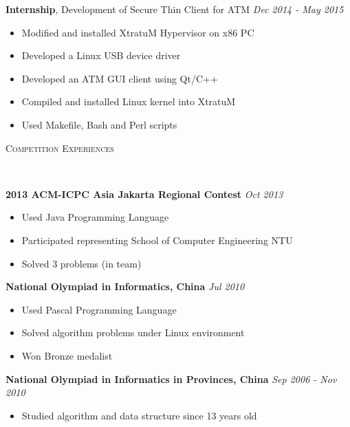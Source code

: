 \documentclass[a4paper, 12pt]{article}
\newenvironment{changemargin}[2]{%
  \begin{list}{}{%
      \setlength{\topsep}{0pt}%
      \setlength{\leftmargin}{#1}%
      \setlength{\rightmargin}{#2}%
      \setlength{\listparindent}{\parindent}%
      \setlength{\itemindent}{\parindent}%
      \setlength{\parsep}{\parskip}%
    }%
  \item[]}{\end{list}
}
\newcommand{\lineover}{
  \begin{changemargin}{-0.05in}{-0.05in}
    \vspace*{-8pt}
    \hrulefill \\
    \vspace*{-2pt}
  \end{changemargin}
}
\newcommand{\header}[1]{
  \begin{changemargin}{-0.6in}{-0.6in}
    \fontsize{15}{15}\scshape{#1}\\
    \lineover
    \vspace*{-4pt}
  \end{changemargin}
}
\newenvironment{body}
{
\vspace*{-16pt}
\begin{changemargin}{-0.25in}{-0.5in}
}
{
\end{changemargin}
}
\begin{document}
\begin{body}
  \textbf{Internship}, {Development of Secure Thin Client for ATM} \hfill \emph{Dec 2014 - May 2015}\\
  \vspace*{-6pt}
  \begin{itemize} \itemsep -0pt  \small
  \item Modified and installed XtratuM Hypervisor on x86 PC
  \item Developed a Linux USB device driver
  \item Developed an ATM GUI client using Qt/C++
  \item Compiled and installed Linux kernel into XtratuM
  \item Used Makefile, Bash and Perl scripts
  \end{itemize}
\end{body}

\header{Competition Experiences}

\begin{body}
  \vspace{14pt}

  \textbf{2013 ACM-ICPC Asia Jakarta Regional Contest} \hfill \emph{Oct 2013}\\
  \vspace*{-6pt}
  \begin{itemize} \itemsep -0pt  \small
  \item Used Java Programming Language
  \item Participated representing School of Computer Engineering NTU
  \item Solved 3 problems (in team)
  \end{itemize}
  
  \textbf{National Olympiad in Informatics, China} \hfill \emph{Jul 2010}\\
  \vspace*{-6pt}
  \begin{itemize} \itemsep -0pt \small
  \item Used Pascal Programming Language
  \item Solved algorithm problems under Linux environment
  \item Won Bronze medalist
  \end{itemize}

  \textbf{National Olympiad in Informatics in Provinces, China} \hfill \emph{Sep 2006 - Nov 2010}\\
  \vspace*{-6pt}
  \begin{itemize} \itemsep -0pt \small
  \item Studied algorithm and data structure since 13 years old
  \end{itemize}
\end{body}
\end{document}
